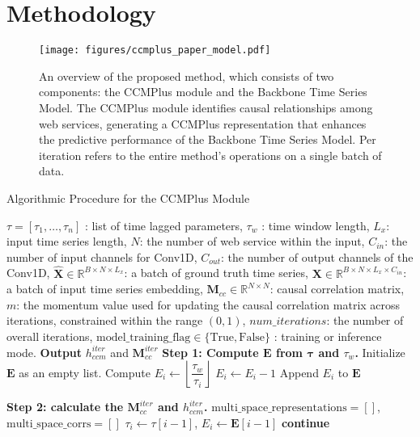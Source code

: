 \section{Methodology}
\begin{figure*}[t]
    \centering
\texttt{[image: figures/ccmplus\_paper\_model.pdf]}
    \caption{An overview of the proposed method, which consists of two components: the CCMPlus module and the Backbone Time Series Model. The CCMPlus module identifies causal relationships among web services, generating a CCMPlus representation that enhances the predictive performance of the Backbone Time Series Model. Per iteration refers to the entire method's operations on a single batch of data.}
    \label{fig:model}
\end{figure*}

\begin{algorithm*}[t]

\caption{Algorithmic Procedure for the CCMPlus Module}
\label{alg:ccmplus_module}
\begin{algorithmic}[1]

\Require $\tau = [\tau_1, \ldots, \tau_n]$ : list of time lagged parameters, $\tau_w$ : time window length, 
$L_x$: input time series length,
$N$: the number of web service within the input,
$C_{in}$: the number of input channels for Conv1D,
$C_{out}$: the number of output channels of the Conv1D,
$\hat{\mathbf{X}} \in \mathbb{R}^{B\times N\times L_x}$: a batch of ground truth time series,
$\mathbf{X}\in \mathbb{R}^{B\times N \times L_x \times C_{in}}$: a batch of input time series embedding,
$\mathbf{M}_{cc} \in \mathbb{R}^{N\times N}$: causal correlation matrix,
$m$: the momentum value used for updating the causal correlation matrix across iterations, constrained within the range \( (0, 1) \),
$num\_iterations$: the number of overall iterations,
$\text{model\_training\_flag} \in \{\text{True}, \text{False}\}$ : training or inference mode.
\Ensure \textbf{Output} $h_{ccm}^{iter}$ and $\mathbf{M}_{cc}^{iter}$
\Statex \textbf{Step 1: Compute $\mathbf{E}$ from $\mathbf{\tau}$ and $\tau_w$.}
\State Initialize $\mathbf{E}$ as an empty list.
    \State Compute $E_i \gets \left\lfloor \dfrac{\tau_w}{\tau_i} \right\rfloor$
        \State $E_i \gets E_i - 1$
    \EndIf
    \State Append $E_i$ to $\mathbf{E}$
\EndFor

\Statex \textbf{Step 2: calculate the $\mathbf{M}_{cc}^{iter}$ and $h_{ccm}^{iter}$.}
    \State $\text{multi\_space\_representations} = []$, $\text{multi\_space\_corrs} = []$ 
        \State $\tau_i \gets \tau[i-1]$, \quad $E_i \gets \mathbf{E}[i-1]$
            \State \textbf{continue} 
        \EndIf



\end{algorithmic}
\end{algorithm*}
